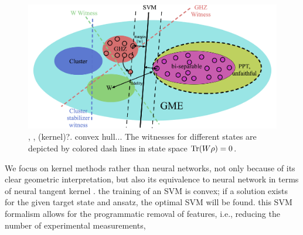 \documentclass[
reprint,
aps,
pra,
floatfix,
]{revtex4-2}
\theoremstyle{plain}
\theoremstyle{definition}
\newcommand{\ew}{W}
\newcommand{\dm}{\rho}
\begin{document}
\begin{figure}[!ht]
	\centering
		\centering
		\includegraphics[width=.8\linewidth]{schematic_entangle.png}
	\caption{ , ,  (kernel)?. convex hull... The witnesses for different states are depicted by colored dash lines in state space $\Tr(\ew\dm)=0$. }
	\label{fig:entangle}
\end{figure}

We focus on kernel methods rather than neural networks, 
not only because of its clear geometric interpretation, but also its equivalence to neural network in terms of neural tangent kernel \cite{jacotNeuralTangentKernel2020}.
the training of an SVM is convex; if a solution exists for the given target state and ansatz, the optimal SVM will be found.
this SVM formalism allows for the programmatic removal of features, i.e., reducing the number of experimental measurements, 

\end{document}

